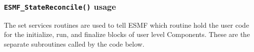  
\setlength{\oldparskip}{\parskip}
\setlength{\parskip}{1.5ex}
\setlength{\oldparindent}{\parindent}
\setlength{\parindent}{0pt}
\setlength{\oldbaselineskip}{\baselineskip}
\setlength{\baselineskip}{11pt}
 
\def\bv{\begin{verbatim}}
\def\ev{\end{verbatim}}
\def\be{\begin{equation}}
\def\ee{\end{equation}}
\def\bea{\begin{eqnarray}}
\def\eea{\end{eqnarray}}
\def\bi{\begin{itemize}}
\def\ei{\end{itemize}}
\def\bn{\begin{enumerate}}
\def\en{\end{enumerate}}
\def\bd{\begin{description}}
\def\ed{\end{description}}
\def\({\left (}
\def\){\right )}
\def\[{\left [}
\def\]{\right ]}
\def\<{\left  \langle}
\def\>{\right \rangle}
\def\cI{{\cal I}}
\def\diag{\mathop{\rm diag}}
\def\tr{\mathop{\rm tr}}


 

  \subsubsection{{\tt ESMF\_StateReconcile()} usage}
    
   The set services routines are used to tell ESMF which routine
   hold the user code for the initialize, run, and finalize
   blocks of user level Components.
   These are the separate subroutines called by the code below. 

